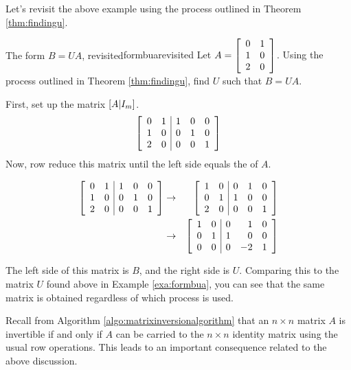 Let's revisit the above example using the process outlined in Theorem \ref{thm:findingu}.

\begin{example}{The form $B=UA$, revisited}{formbuarevisited}
Let $A = \left[ 
\begin{array}{rr} 
0 & 1 \\
1 & 0 \\
2 & 0 
\end{array}\right]$. Using the process outlined in Theorem \ref{thm:findingu}, find $U$ such that $B=UA$. 
\end{example}

\begin{solution}
First, set up the matrix $\left[ A | I_m \right]$. 
\[
\left[ \begin{array}{rr|rrr}
0 & 1 & 1 & 0 & 0 \\
1 & 0 & 0 & 1 & 0 \\
2 & 0 & 0 & 0 & 1 
\end{array}\right]
\]
Now, row reduce this matrix until the left side equals the {\rref} of $A$. 

\begin{eqnarray*}
\left[ \begin{array}{rr|rrr}
0 & 1 & 1 & 0 & 0 \\
1 & 0 & 0 & 1 & 0 \\
2 & 0 & 0 & 0 & 1 
\end{array}\right] 
&\rightarrow& 
\left[ \begin{array}{rr|rrr}
1 & 0 & 0 & 1 & 0 \\
0 & 1 & 1 & 0 & 0 \\
2 & 0 & 0 & 0 & 1 
\end{array}\right] \\
&\rightarrow&
\left[ \begin{array}{rr|rrr}
1 & 0 & 0 & 1 & 0 \\
0 & 1 & 1 & 0 & 0 \\
0 & 0 & 0 & -2 & 1 
\end{array}\right]
\end{eqnarray*}

The left side of this matrix is $B$, and the right side is $U$. Comparing this to the matrix $U$ found above in Example \ref{exa:formbua}, you can see that the same matrix is obtained regardless of which process is used. 
\end{solution}

Recall from Algorithm \ref{algo:matrixinversionalgorithm} that an $n \times n$  matrix $A$ is invertible if and only if $A$ can be carried to the $n \times n$ identity matrix using the usual row operations. This leads to an important consequence related to the above discussion. 

